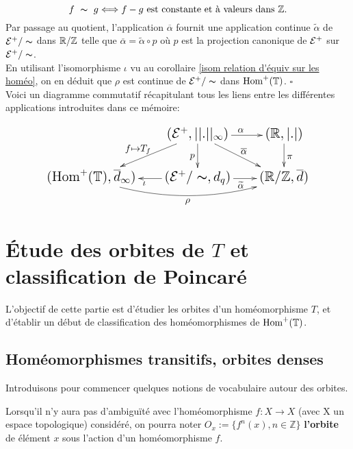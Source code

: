 	$$f\ \thicksim\ g \Longleftrightarrow f-g \text{ est constante et à valeurs dans\ } \mathbb{Z}.$$
	Par passage au quotient, l'application $\overline{\alpha}$ fournit une application continue $\widetilde{\alpha}$ de $\mathcal{E}^+/\thicksim$ dans ${\mathbb{R}}/\mathbb{Z}$ telle que $\overline{\alpha}=\widetilde{\alpha}\circ p$ où $p$ est la projection canonique de ${\mathcal{E}}^+$ sur  $\mathcal{E}^+/\thicksim$.\\ En utilisant l'isomorphisme $\iota$ vu au corollaire \ref{isom relation d'équiv sur les homéo}, on en déduit que $\rho$ est continue de $\mathcal{E}^+/\thicksim$ dans $\mathrm{Hom}^+({\mathbb{T}})$. \hfill $\square$\\






Voici un diagramme commutatif récapitulant tous les liens entre les différentes applications introduites dans ce mémoire:

$$\Large\xymatrix{
	&(\Ec^+,||.||_\infty) \ar[dl]_{f\mapsto T_f} \ar[r]^{\alpha} \ar[d]_p \ar[dr]^{\overline{\alpha}} & (\Rbb,|.|) \ar[d]^\pi\\
	(\HomT,\overline{d}_\infty)\ar@/_1.5pc/@{->}[rr]_\rho&(\EnsembleQuotient{\Ec^+}{\thicksim},d_q) \ar[l]^\iota \ar[r]_{\widetilde{\alpha}} & (\EnsembleQuotient{\Rbb}{\Zbb},\overline{d})}$$













\section{Étude des orbites de $T$ et classification de Poincaré}

L'objectif de cette partie est d'étudier les orbites d'un homéomorphisme $T$, et d'établir un début de classification des homéomorphismes de $\mathrm{Hom}^+({\mathbb{T}})$.

\subsection{Homéomorphismes transitifs, orbites denses}
Introduisons pour commencer quelques notions de vocabulaire autour des orbites.






\begin{notation}
	Lorsqu'il n'y aura pas d'ambiguïté avec l'homéomorphisme $f: X \to X$ (avec X un espace topologique) considéré, on pourra noter $O_x := \lbrace f^n(x), n\in \mathbb{Z}\rbrace$ \textbf{l'orbite} de élément $x$ sous l'action d'un homéomorphisme $f$.
\end{notation}


